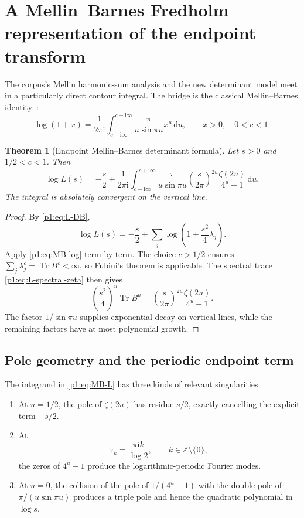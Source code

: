 \documentclass[11pt,oneside]{article}
\newtheorem{theorem}{Theorem}[section]
\theoremstyle{definition}
\newcommand{\dd}{\,\mathrm d}
\newcommand{\ii}{\mathrm i}
\newcommand{\Z}{\mathbb Z}
\newcommand{\Tr}{\operatorname{Tr}}
\begin{document}
\section{A Mellin--Barnes Fredholm representation of the endpoint transform}
\label{p1:sec:MB}

The corpus's Mellin harmonic-sum analysis and the new determinant model meet in a
particularly direct contour integral.  The bridge is the classical Mellin--Barnes
identity~\cite{p1:FlajoletGourdonDumas1995}:
\begin{equation}
 \log(1+x)=\frac1{2\pi\ii}
 \int_{c-\ii\infty}^{c+\ii\infty}
 \frac{\pi}{u\sin\pi u}x^u\dd u,
 \qquad x>0,\quad0<c<1.
 \label{p1:eq:MB-log}
\end{equation}

\begin{theorem}[Endpoint Mellin--Barnes determinant formula]
\label{p1:thm:MB}
Let \(s>0\) and \(1/2<c<1\).  Then
\begin{equation}
 \boxed{\quad
 \log L(s)=-\frac s2+\frac1{2\pi\ii}
 \int_{c-\ii\infty}^{c+\ii\infty}
 \frac{\pi}{u\sin\pi u}
 \left(\frac{s}{2\pi}\right)^{2u}
 \frac{\zeta(2u)}{4^u-1}\dd u.
 \quad}
 \label{p1:eq:MB-L}
\end{equation}
The integral is absolutely convergent on the vertical line.
\end{theorem}

\begin{proof}
By \eqref{p1:eq:L-DB},
\[
 \log L(s)=-\frac s2+\sum_j\log\left(1+\frac{s^2}{4}\lambda_j\right).
\]
Apply \eqref{p1:eq:MB-log} term by term.  The choice \(c>1/2\) ensures
\(\sum_j\lambda_j^c=\Tr B^c<\infty\), so Fubini's theorem is applicable.  The
spectral trace \eqref{p1:eq:L-spectral-zeta} then gives
\[
 \left(\frac{s^2}{4}\right)^u\Tr B^u
 =\left(\frac{s}{2\pi}\right)^{2u}
 \frac{\zeta(2u)}{4^u-1}.
\]
The factor \(1/\sin\pi u\) supplies exponential decay on vertical lines, while the
remaining factors have at most polynomial growth.
\end{proof}

\subsection{Pole geometry and the periodic endpoint term}

The integrand in \eqref{p1:eq:MB-L} has three kinds of relevant singularities.

\begin{enumerate}[label=(\roman*),leftmargin=2.2em]
\item At \(u=1/2\), the pole of \(\zeta(2u)\) has residue \(s/2\), exactly cancelling
      the explicit term \(-s/2\).
\item At
\begin{equation}
 \tau_k=\frac{\pi\ii k}{\log2},\qquad k\in\Z\setminus\{0\},
 \label{p1:eq:tau-k}
\end{equation}
      the zeros of \(4^u-1\) produce the logarithmic-periodic Fourier modes.
\item At \(u=0\), the collision of the pole of \(1/(4^u-1)\) with the double pole of
      \(\pi/(u\sin\pi u)\) produces a triple pole and hence the quadratic polynomial
      in \(\log s\).
\end{enumerate}
\end{document}
